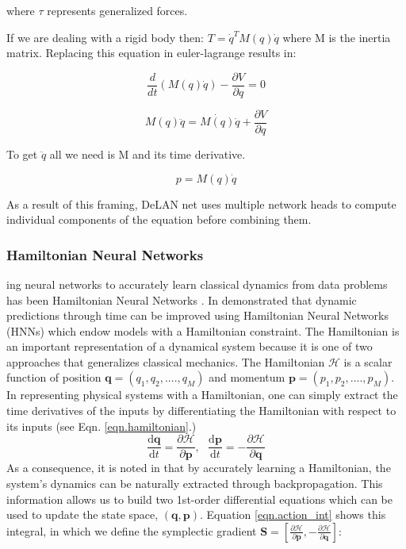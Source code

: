 \documentclass{article}
\begin{document}
where $\tau$ represents generalized forces.

If we are dealing with a rigid body then: $ T = \dot{q}^T M(q) \dot{q} $ where M is the inertia matrix. Replacing this equation in euler-lagrange results in:

$$ \frac{d}{dt} (M(q)\dot{q}) - \frac{\partial V}{\partial q} = 0 $$

$$ M(q)\ddot{q} = \dot{M(q)} \dot{q} + \frac{\partial V}{\partial q} $$

To get $\ddot{q}$ all we need is M and its time derivative. 

$$ p = M(q) \dot{q} $$

As a result of this framing, DeLAN net uses multiple network heads to compute individual components of the equation before combining them. 

\subsubsection{Hamiltonian Neural Networks}
\label{HNN}
ing neural networks to accurately learn classical dynamics from data  problems has been Hamiltonian Neural Networks \cite{greydanus_hamiltonian_2019}. In  demonstrated that dynamic predictions through time can be improved using Hamiltonian Neural Networks (HNNs) which endow models with a Hamiltonian constraint. The Hamiltonian is an important representation of a dynamical system because it is one of two approaches that generalizes classical mechanics. The Hamiltonian $\mathcal{H}$ is a scalar function of position $\mathbf{q} = (q_1,q_2,....,q_M)$ and momentum $\mathbf{p} = (p_1,p_2,....,p_M)$. In representing physical systems with a Hamiltonian, one can simply extract the time derivatives of the inputs by differentiating the Hamiltonian with respect to its inputs (see Eqn. \ref{eqn.hamiltonian}.)
\begin{equation}
\frac{\mathrm{d}\mathbf{q}}{\mathrm{d}t} = \frac{\partial \mathcal{H}}{\partial \mathbf{p}}, ~~~
\frac{\mathrm{d}\mathbf{p}}{\mathrm{d}t} = -\frac{\partial \mathcal{H}}{\partial \mathbf{q}}
\label{eqn.hamiltonian}
\end{equation}
As a consequence, it is noted in \cite{greydanus_hamiltonian_2019} that by accurately learning a Hamiltonian, the system's dynamics can be naturally extracted through backpropagation. This information allows us to build two 1st-order differential equations which can be used to update the state space, $(\mathbf{q},\mathbf{p})$. Equation \ref{eqn.action_int} shows this integral, in which we define the symplectic gradient $\mathbf{S}  = \left [ \frac{\partial \mathcal{H}}{\partial \mathbf{p}},-\frac{\partial \mathcal{H}}{\partial \mathbf{q}} \right ] $:
\end{document}
